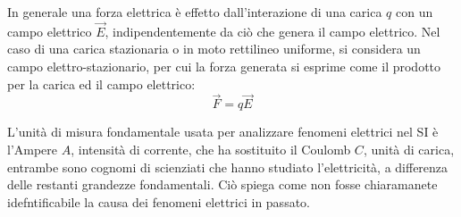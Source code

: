 \documentclass{article}
\numberwithin{equation}{subsection}
\begin{document}
In generale una forza elettrica è effetto dall'interazione di una carica $q$ con un campo elettrico $\vec{E}$, indipendentemente da ciò che genera il campo elettrico. Nel 
caso di una carica stazionaria o in moto rettilineo uniforme, si considera un campo elettro-stazionario, per cui la forza generata si esprime come il prodotto per la carica 
ed il campo elettrico: 
\begin{equation}
    \vec{F}=q\vec{E}
\end{equation}

L'unità di misura fondamentale usata per analizzare fenomeni elettrici nel SI è l'Ampere $A$, intensità di corrente, che ha sostituito il Coulomb $C$, unità di carica, 
entrambe sono cognomi di scienziati che hanno studiato l'elettricità, a differenza delle restanti grandezze fondamentali. Ciò spiega come non fosse chiaramanete 
idefntificabile la causa dei fenomeni elettrici in passato. 
\end{document}
